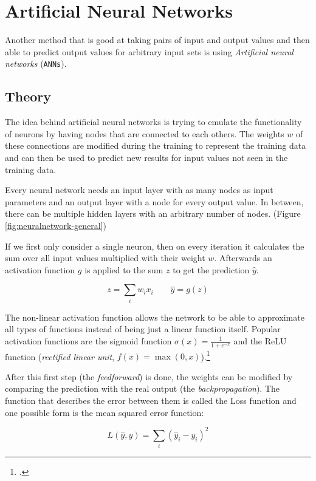 \section{Artificial Neural Networks}

Another method that is good at taking pairs of input and output values and then able to predict output values for arbitrary input sets is using \textit{Artificial neural networks} (\texttt{ANNs}).

\subsection{Theory}

The idea behind artificial neural networks is trying to emulate the functionality of neurons by having nodes that are connected to each others. The weights $w$ of these connections are modified during the training to represent the training data and can then be used to predict new results for input values not seen in the training data.

Every neural network needs an input layer with as many nodes as input parameters and an output layer with a node for every output value. In between, there can be multiple hidden layers with an arbitrary number of nodes. (Figure \ref{fig:neuralnetwork-general})

If we first only consider a single neuron, then on every iteration it calculates the sum over all input values multiplied with their weight $w$. Afterwards an activation function $g$ is applied to the sum $z$ to get the prediction $\hat{y}$.

\begin{equation}
	z=\sum_{i}w_ix_i \qquad \hat{y}=g(z)
\end{equation}

The non-linear activation function allows the network to be able to approximate all types of functions instead of being just a linear function itself. Popular activation functions are the sigmoid function $\sigma(x)={\frac {1}{1+e^{-x}}}$ and the ReLU function (\textit{rectified linear unit}, $f(x)=\max(0,x)$).\footcite{NN-math}

After this first step (the \textit{feedforward}) is done, the weights can be modified by comparing the prediction with the real output (the \textit{backpropagation}). The function that describes the error between them is called the Loss function and one possible form is the mean squared error function:

\begin{equation}
	L(\hat{y},y)=\sum_{i}(\hat{y}_i-y_i)^2
\end{equation}

